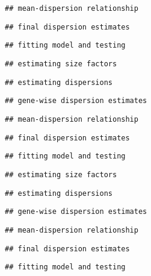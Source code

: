 \documentclass[
]{article}
\begin{document}
\begin{verbatim}
## mean-dispersion relationship
\end{verbatim}

\begin{verbatim}
## final dispersion estimates
\end{verbatim}

\begin{verbatim}
## fitting model and testing
\end{verbatim}

\begin{verbatim}
## estimating size factors
\end{verbatim}

\begin{verbatim}
## estimating dispersions
\end{verbatim}

\begin{verbatim}
## gene-wise dispersion estimates
\end{verbatim}

\begin{verbatim}
## mean-dispersion relationship
\end{verbatim}

\begin{verbatim}
## final dispersion estimates
\end{verbatim}

\begin{verbatim}
## fitting model and testing
\end{verbatim}

\begin{verbatim}
## estimating size factors
\end{verbatim}

\begin{verbatim}
## estimating dispersions
\end{verbatim}

\begin{verbatim}
## gene-wise dispersion estimates
\end{verbatim}

\begin{verbatim}
## mean-dispersion relationship
\end{verbatim}

\begin{verbatim}
## final dispersion estimates
\end{verbatim}

\begin{verbatim}
## fitting model and testing
\end{verbatim}
\end{document}
